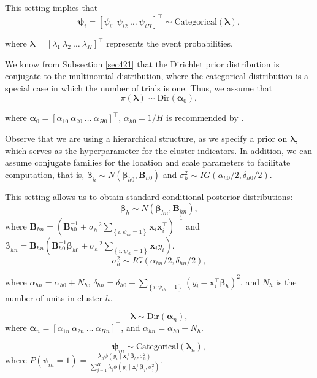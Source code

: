 This setting implies that  
\[
\boldsymbol{\psi}_i = [\psi_{i1} \  \psi_{i2} \ \dots \ \psi_{iH}]^{\top} \sim \text{Categorical}(\boldsymbol{\lambda}),
\] 
  
where \( \boldsymbol{\lambda} = [\lambda_1 \  \lambda_2 \  \dots \ \lambda_H]^{\top} \) represents the event probabilities.

We know from Subsection \ref{sec421} that the Dirichlet prior distribution is conjugate to the multinomial distribution, where the categorical distribution is a special case in which the number of trials is one. Thus, we assume that  
\[
\pi(\boldsymbol{\lambda}) \sim \text{Dir}(\boldsymbol{\alpha}_0),
\]  

where \( \boldsymbol{\alpha}_0 = [\alpha_{10} \ \alpha_{20} \ \dots \ \alpha_{H0}]^{\top} \), $\alpha_{h0}=1/H$ is recommended by \cite[p.~535]{gelman2021bayesian}.  

Observe that we are using a hierarchical structure, as we specify a prior on \( \boldsymbol{\lambda} \), which serves as the hyperparameter for the cluster indicators. In addition, we can assume conjugate families for the location and scale parameters to facilitate computation, that is, $\boldsymbol \beta_h\sim N(\boldsymbol{\beta}_{h0},\boldsymbol{B}_{h0})$ and $\sigma_h^2\sim IG(\alpha_{h0}/2,\delta_{h0}/2)$.

This setting allows us to obtain standard conditional posterior distributions: $$\boldsymbol{\beta}_{h}\sim N(\boldsymbol{\beta}_{hn},\boldsymbol{B}_{hn}),$$ where $\boldsymbol{B}_{hn}=(\boldsymbol{B}_{h0}^{-1}+\sigma_h^{-2}\sum_{\left\{i:  \psi_{ih}=1\right\}}\boldsymbol{x}_i\boldsymbol{x}_i^{\top})^{-1}$ and $\boldsymbol{\beta}_{hn}=\boldsymbol{B}_{hn}(\boldsymbol{B}_{h0}^{-1}\boldsymbol{\beta}_{h0}+\sigma_h^{-2}\sum_{\left\{i:  \psi_{ih}=1\right\}}\boldsymbol{x}_iy_i)$.
$$\sigma_h^2\sim IG(\alpha_{hn}/2,\delta_{hn}/2),$$

where $\alpha_{hn}=\alpha_{h0}+N_h$, $\delta_{hn}=\delta_{h0}+\sum_{\left\{i:  \psi_{ih}=1\right\}}(y_i-\boldsymbol{x}_i^{\top}\boldsymbol{\beta}_h)^2$, and $N_h$ is the number of units in cluster $h$.

$$\boldsymbol{\lambda}\sim \text{Dir}(\boldsymbol{\alpha}_n),$$   
where $\boldsymbol{\alpha}_n=[\alpha_{1n} \  \alpha_{2n} \ \dots \ \alpha_{Hn}]^{\top}$, and $\alpha_{hn}=\alpha_{h0}+N_h$.

$$\boldsymbol{\psi}_{in}\sim \text{Categorical}(\boldsymbol{\lambda}_n),$$
where $P(\psi_{ih}=1)=\frac{\lambda_{h}\phi(y_i \mid \boldsymbol{x}_i^{\top}\boldsymbol{\beta}_h,\sigma_h^2)}{\sum_{j=1}^H\lambda_{j}\phi(y_i \mid \boldsymbol{x}_i^{\top}\boldsymbol{\beta}_j,\sigma_j^2)}$.

